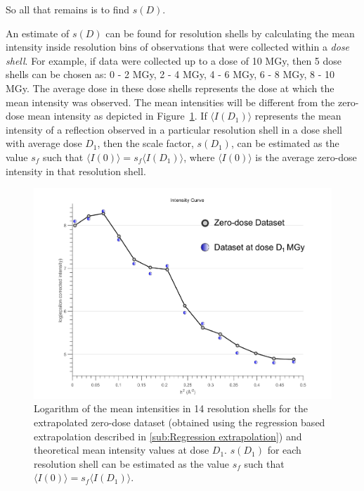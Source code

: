 So all that remains is to find $s(D)$.

An estimate of $s(D)$ can be found for resolution shells by calculating the mean intensity inside resolution bins of observations that were collected within a \textit{dose shell}.
For example, if data were collected up to a dose of 10 MGy, then 5 dose shells can be chosen as: 0 - 2 MGy, 2 - 4 MGy, 4 - 6 MGy, 6 - 8 MGy, 8 - 10 MGy.
The average dose in these dose shells represents the dose at which the mean intensity was observed.
The mean intensities will be different from the zero-dose mean intensity as depicted in Figure~\ref{fig:mean intensity in resolution shells, various doses - Extrapolation method}.
If $\langle I(D_1) \rangle$ represents the mean intensity of a reflection observed in a particular resolution shell in a dose shell with average dose $D_1$, then the scale factor, $s(D_1)$, can be estimated as the value $s_f$ such that $\langle I(0) \rangle = s_f \langle I(D_1) \rangle$, where $\langle I(0) \rangle$ is the average zero-dose intensity in that resolution shell.
\begin{figure}
  \centering
    \includegraphics[width=1\textwidth]{figures/zde/extrapolationscaling_scale_points.pdf}
    \caption[Logarithm of the zero-dose mean intensities in 14 resolution shells with theoretical means for a later dataset.]{Logarithm of the mean intensities in 14 resolution shells for the extrapolated zero-dose dataset (obtained using the regression based extrapolation described in \ref{sub:Regression extrapolation}) and theoretical mean intensity values at dose $D_1$.
    $s(D_1)$ for each resolution shell can be estimated as the value $s_f$ such that $\langle I(0) \rangle = s_f \langle I(D_1) \rangle$.}
    \label{fig:mean intensity in resolution shells, various doses - Extrapolation method}
\end{figure}
